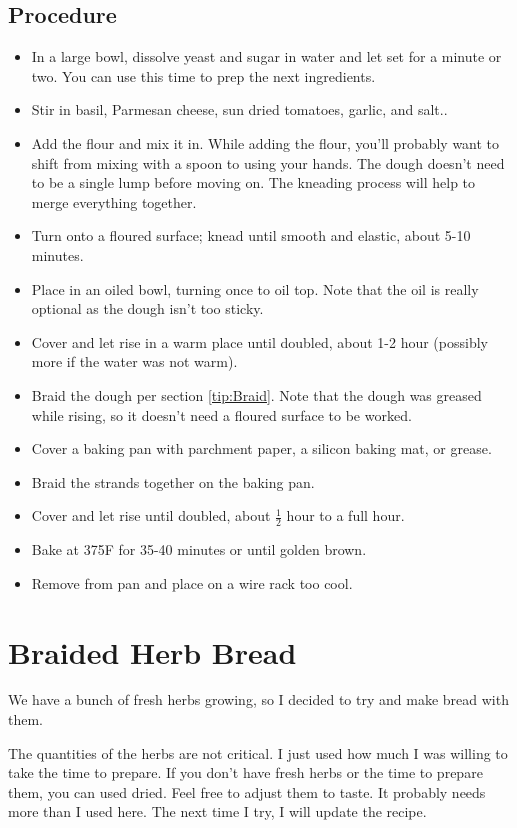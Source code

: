 \documentclass[10pt, openany]{book}
\begin{document}
\subsection{Procedure}
\begin{itemize}
  \item In a large bowl, dissolve yeast and sugar in water and let set for a minute or two.  You can use this time to prep the next ingredients.
  \item Stir in basil, Parmesan cheese, sun dried tomatoes, garlic, and salt..
  \item Add the flour and mix it in.  While adding the flour, you'll probably want to shift from mixing with a spoon to using your hands.  The dough doesn't need to be a single lump before moving on.  The kneading process will help to merge everything together.
  \item Turn onto a floured surface; knead until smooth and elastic, about 5-10 minutes.
  \item Place in an oiled bowl, turning once to oil top.  Note that the oil is really optional as the dough isn't too sticky.
  \item Cover and let rise in a warm place until doubled, about 1-2 hour (possibly more if the water was not warm).
  \item Braid the dough per section \ref{tip:Braid}.  Note that the dough was greased while rising, so it doesn't need a floured surface to be worked.
  \item Cover a baking pan with parchment paper, a silicon baking mat, or grease.
  \item Braid the strands together on the baking pan.
  \item Cover and let rise until doubled, about $\frac{1}{2}$ hour to a full hour.
  \item Bake at 375\degree{}F for 35-40 minutes or until golden brown.
  \item Remove from pan and place on a wire rack too cool.
\end{itemize}

\section{Braided Herb Bread}
\label{bread:Herb}
We have a bunch of fresh herbs growing, so I decided to try and make bread with them.

The quantities of the herbs are not critical.  I just used how much I was willing to take the time to prepare.  If you don't have fresh herbs or the time to prepare them, you can used dried.  Feel free to adjust them to taste.  It probably needs more than I used here.  The next time I try, I will update the recipe.
\end{document}
